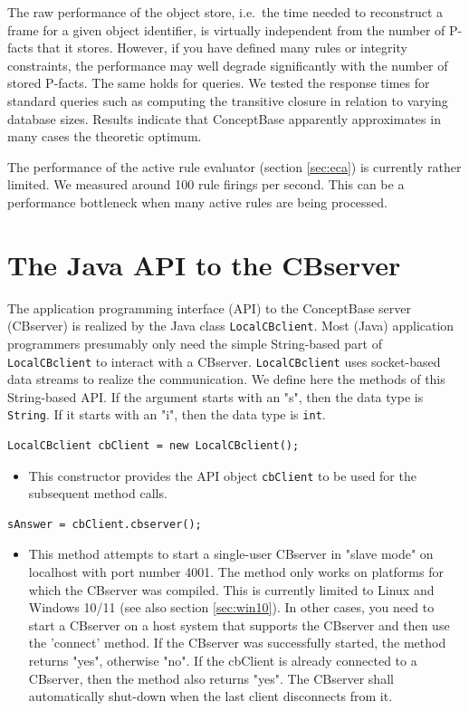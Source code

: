 The raw performance of the object store, i.e.\ the time needed to reconstruct a 
frame for a given object identifier, is virtually independent from
the number of P-facts that it stores. However, if you have defined many rules
or integrity constraints, the performance may well degrade significantly
with the number of stored P-facts. The same holds for queries. 
We tested the response times for standard queries such as computing the
transitive closure in relation to varying database sizes. Results indicate that
ConceptBase apparently approximates in many cases the theoretic optimum. 

The performance of the active rule evaluator (section \ref{sec:eca}) is currently 
rather limited. We measured around 100 rule firings per second. This can be a 
performance bottleneck when many active rules are being processed.



\section{The Java API to the CBserver}
\label{sec:javaapi}

The application programming interface (API)
to the ConceptBase server (CBserver) is realized by the Java class 
{\tt LocalCBclient}.
Most (Java) application programmers presumably only need the simple String-based
part of {\tt LocalCBclient} to interact with a CBserver. {\tt LocalCBclient} uses
socket-based data streams to realize the communication.
We define here the methods of this String-based API. If the argument starts with an "s",
then the data type is {\tt String}. If it starts with an "i", then the data type
is {\tt int}.


\begin{verbatim}
LocalCBclient cbClient = new LocalCBclient();
\end{verbatim}

\begin{itemize}
\item This constructor provides the API object {\tt cbClient} to be used for the
subsequent method calls.
\end{itemize}

\begin{verbatim}
sAnswer = cbClient.cbserver();
\end{verbatim}

\begin{itemize}
\item This method attempts to start a single-user CBserver in "slave mode" 
on localhost with port number 4001.
The method only works on platforms for which the CBserver was compiled. This is currently
limited to Linux and Windows 10/11 (see also section \ref{sec:win10}). In other cases,
you need to start a CBserver on a host system that supports the CBserver and then use the 'connect'
method. If the CBserver was successfully started, the method returns "yes", otherwise "no".
If the cbClient is already connected to a CBserver, then the method also returns "yes".
The CBserver shall automatically shut-down when the last client disconnects from it.
\end{itemize}

